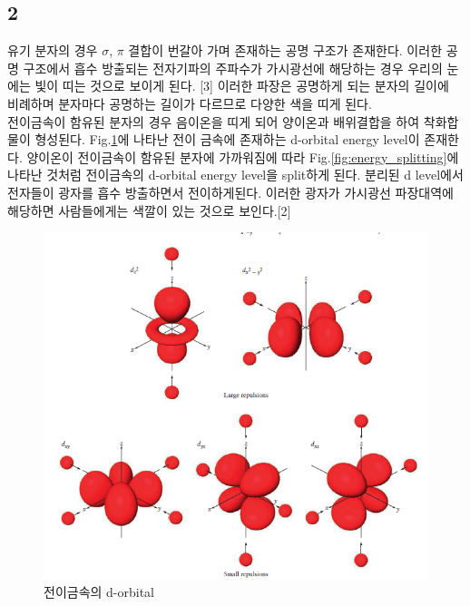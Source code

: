 \documentclass[%
 reprint,
 amsmath,amssymb,
 aps,
]{revtex4-2}
\begin{document}
\subsection{\label{sec:level2}2}
유기 분자의 경우 $\sigma$, $\pi$ 결합이 번갈아 가며 존재하는 공명 구조가 존재한다. 이러한 공명 구조에서 흡수 방출되는 전자기파의 주파수가 가시광선에 해당하는 경우 우리의 눈에는 빛이 띠는 것으로 보이게 된다. [3] 이러한 파장은 공명하게 되는 분자의 길이에 비례하며 분자마다 공명하는 길이가 다르므로 다양한 색을 띠게 된다.\\

전이금속이 함유된 분자의 경우 음이온을 띠게 되어 양이온과 배위결합을 하여 착화합물이 형성된다. Fig.\ref{fig:d_orbital}에 나타난 전이 금속에 존재하는 d-orbital energy level이 존재한다. 양이온이 전이금속이 함유된 분자에 가까워짐에 따라 Fig.\ref{fig:energy_splitting}에 나타난 것처럼 전이금속의 d-orbital energy level을 split하게 된다. 분리된 d level에서 전자들이 광자를 흡수 방출하면서 전이하게된다. 이러한 광자가 가시광선 파장대역에 해당하면 사람들에게는 색깔이 있는 것으로 보인다.[2]
\begin{figure}[htbp]
	\includegraphics[width = 0.9\linewidth]{d_orbital.png}%
	\caption{\label{fig:d_orbital}전이금속의 d-orbital}
\end{figure}
\end{document}
